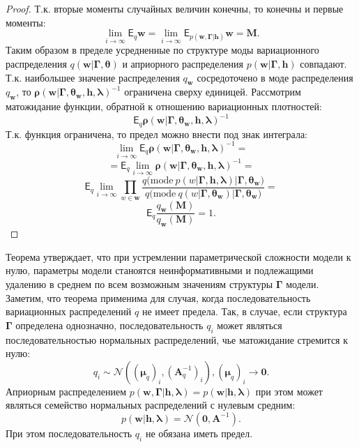 \begin{proof}
Т.к. вторые моменты случайных величин конечны, то конечны и первые моменты:
\[
  \lim_{i \to \infty} \mathsf{E}_{q}\mathbf{w}= \lim_{i \to \infty}\mathsf{E}_{p(\mathbf{w},\boldsymbol{\Gamma}|\mathbf{h})}\mathbf{w} = \mathbf{M}.
\]
Таким образом в пределе усредненные по структуре моды вариационного распределения $q(\mathbf{w}|\boldsymbol{\Gamma}, \boldsymbol{\theta})$ и априорного распределения $p(\mathbf{w}|\boldsymbol{\Gamma}, \mathbf{h})$ совпадают.
Т.к. наибольшее значение распределения $q_\mathbf{w}$ сосредоточено в моде распределения $q_\mathbf{w}$, то $\boldsymbol{\rho}(\mathbf{w}|\boldsymbol{\Gamma}, \boldsymbol{\theta}_\mathbf{w}, \mathbf{h},\boldsymbol{\lambda})^{-1}$ ограничена сверху единицей. Рассмотрим матожидание функции, обратной к отношению вариационных плотностей:
\[
\mathsf{E}_q \boldsymbol{\rho}(\mathbf{w}|\boldsymbol{\Gamma}, \boldsymbol{\theta}_\mathbf{w}, \mathbf{h},\boldsymbol{\lambda})^{-1}
\] 
Т.к. функция ограничена, то предел можно внести под знак интеграла:
\[
\lim_{i \to \infty} \mathsf{E}_q \boldsymbol{\rho}(\mathbf{w}|\boldsymbol{\Gamma}, \boldsymbol{\theta}_\mathbf{w}, \mathbf{h},\boldsymbol{\lambda})^{-1} = 
\]
\[
 =\mathsf{E}_q  \lim_{i \to \infty}  \boldsymbol{\rho}(\mathbf{w}|\boldsymbol{\Gamma}, \boldsymbol{\theta}_\mathbf{w}, \mathbf{h},\boldsymbol{\lambda})^{-1} =
\]
\[
    \mathsf{E}_q \lim_{i \to \infty} \prod_{w \in \mathbf{w}}\frac{q\bigl(\text{mode}~p\left({w}|\boldsymbol{\Gamma}, \mathbf{h},\boldsymbol{\lambda}\right)|\boldsymbol{\Gamma},\boldsymbol{\theta}_\mathbf{w}\bigr)}{q\bigl(\text{mode}~q\left(w|\boldsymbol{\Gamma}, \boldsymbol{\theta}_\mathbf{w}\right)|\boldsymbol{\Gamma}, \boldsymbol{\theta}_\mathbf{w}\bigr)}=
\]
\[
     \mathsf{E}_q \frac{q_\mathbf{w}(\mathbf{M})}{q_\mathbf{w}(\mathbf{M})} = 1.
\]

\end{proof}

Теорема утверждает, что при устремлении параметрической сложности модели к нулю, параметры модели станоятся неинформативными и подлежащими удалению в среднем по всем возможным значениям  структуры  $\boldsymbol{\Gamma}$ модели. Заметим, что теорема применима для случая, когда последовательность вариационных распределений $q$ не имеет предела. Так, в случае, если структура $\boldsymbol{\Gamma}$ определена однозначно, последовательность $q_i$ может являться последовательностью нормальных распределений, чье матожидание стремится к нулю:
\[
    q_i \sim \mathcal{N}((\boldsymbol{\mu}_q)_i, (\mathbf{A}^{-1}_q)_i), (\boldsymbol{\mu}_q)_i \to \mathbf{0}.
\]
Априорным распределением $p(\mathbf{w},\boldsymbol{\Gamma}|\mathbf{h},\boldsymbol{\lambda}) = p(\mathbf{w}|\mathbf{h},\boldsymbol{\lambda})$ при этом может являться семейство нормальных распределений с нулевым средним:
\[
    p(\mathbf{w}|\mathbf{h},\boldsymbol{\lambda}) = \mathcal{N}(\mathbf{0}, \mathbf{A}^{-1}).
\]
При этом последовательность $q_i$ не обязана иметь предел.


